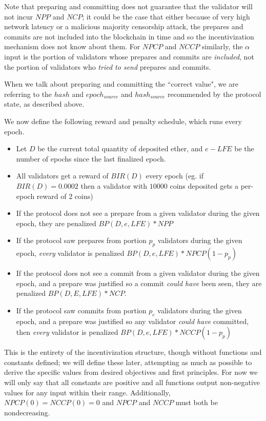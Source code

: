 \documentclass[12pt]{article}
\begin{document}
Note that preparing and committing does not guarantee that the validator will not incur $NPP$ and $NCP$; it could be the case that either because of very high network latency or a malicious majority censorship attack, the prepares and commits are not included into the blockchain in time and so the incentivization mechanism does not know about them. For $NPCP$ and $NCCP$ similarly, the $\alpha$ input is the portion of validators whose prepares and commits are \textit{included}, not the portion of validators who \textit{tried to send} prepares and commits. 

When we talk about preparing and committing the ``correct value", we are referring to the $hash$ and $epoch_{source}$ and $hash_{source}$ recommended by the protocol state, as described above.

We now define the following reward and penalty schedule, which runs every epoch.

\begin{itemize}
\item Let $D$ be the current total quantity of deposited ether, and $e - LFE$ be the number of epochs since the last finalized epoch.
\item All validators get a reward of $BIR(D)$ every epoch (eg. if $BIR(D) = 0.0002$ then a validator with $10000$ coins deposited gets a per-epoch reward of $2$ coins)
\item If the protocol does not see a prepare from a given validator during the given epoch, they are penalized $BP(D, e, LFE) * NPP$
\item If the protocol saw prepares from portion $p_p$ validators during the given epoch, \textit{every} validator is penalized $BP(D, e, LFE) * NPCP(1 - p_p)$
\item If the protocol does not see a commit from a given validator during the given epoch, and a prepare was justified so a commit \textit{could have} been seen, they are penalized $BP(D, E, LFE) * NCP$.
\item If the protocol saw commits from portion $p_c$ validators during the given epoch, and a prepare was justified so any validator \textit{could have} committed, then \textit{every} validator is penalized $BP(D, e, LFE) * NCCP(1 - p_p)$
\end{itemize}

This is the entirety of the incentivization structure, though without functions and constants defined; we will define these later, attempting as much as possible to derive the specific values from desired objectives and first principles. For now we will only say that all constants are positive and all functions output non-negative values for any input within their range. Additionally, $NPCP(0) = NCCP(0) = 0$ and $NPCP$ and $NCCP$ must both be nondecreasing.
\end{document}
